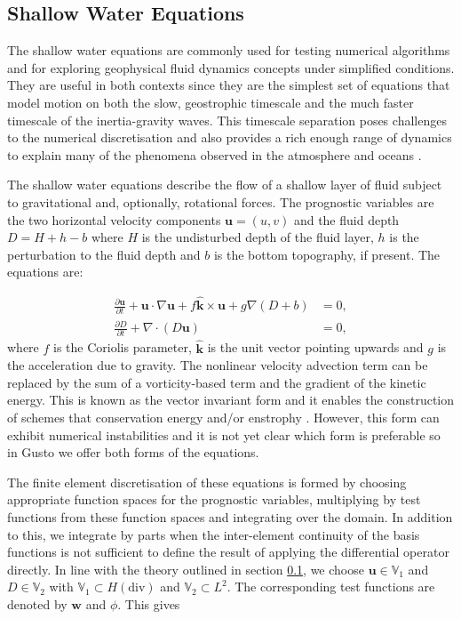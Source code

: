 \documentclass[11pt, a4paper]{article}
\def\MM#1{\boldsymbol{#1}}
\newcommand{\pp}[2]{\frac{\partial #1}{\partial #2}}
\begin{document}
\subsection{Shallow Water Equations}
The shallow water equations are commonly used for testing numerical
algorithms and for exploring geophysical fluid dynamics concepts under
simplified conditions. They are useful in both contexts since they are
the simplest set of equations that model motion on both the slow,
geostrophic timescale and the much faster timescale of the
inertia-gravity waves. This timescale separation poses challenges to
the numerical discretisation and also provides a rich enough range of
dynamics to explain many of the phenomena observed in the atmosphere
and oceans \citep{zeitlin2018geophysical}.

The shallow water equations describe the flow of a shallow layer of
fluid subject to gravitational and, optionally, rotational forces. The
prognostic variables are the two horizontal velocity components
$\MM{u} = (u, v)$ and the fluid depth $D = H + h - b$ where $H$ is the
undisturbed depth of the fluid layer, $h$ is the perturbation to the
fluid depth and $b$ is the bottom topography, if present. The
equations are:

\begin{align}
  \pp{\MM{u}}{t} + \MM{u}\cdot\nabla\MM{u} + f\hat{\MM{k}}\times\MM{u} + g\nabla (D+b) &= 0, \\
  \pp{D}{t} + \nabla\cdot(D\MM{u}) &= 0,
\end{align}
where $f$ is the Coriolis parameter, $\hat{\MM{k}}$ is the unit vector
pointing upwards and $g$ is the acceleration due to gravity. The
nonlinear velocity advection term can be replaced by the sum of a
vorticity-based term and the gradient of the kinetic energy. This is
known as the vector invariant form and it enables the construction of
schemes that conservation energy and/or enstrophy
\citep{mcrae2014energy, bauer2018energy, wimmer2020energy,
  wimmer2021energy}. However, this form can exhibit numerical
instabilities \citep{bell2017numerical} and it is not yet clear which
form is preferable so in Gusto we offer both forms of the equations.

The finite element discretisation of these equations is formed by
choosing appropriate function spaces for the prognostic variables,
multiplying by test functions from these function spaces and
integrating over the domain. In addition to this, we integrate by
parts when the inter-element continuity of the basis functions is not
sufficient to define the result of applying the differential operator
directly. In line with the theory outlined in section \ref{}, we
choose $\MM{u} \in \mathbb{V}_1$ and $D \in \mathbb{V}_2$ with
$\mathbb{V}_1 \subset H(\text{div})$ and $\mathbb{V}_2 \subset L^2$. The
corresponding test functions are denoted by $\MM{w}$ and $\phi$. This gives
\end{document}
